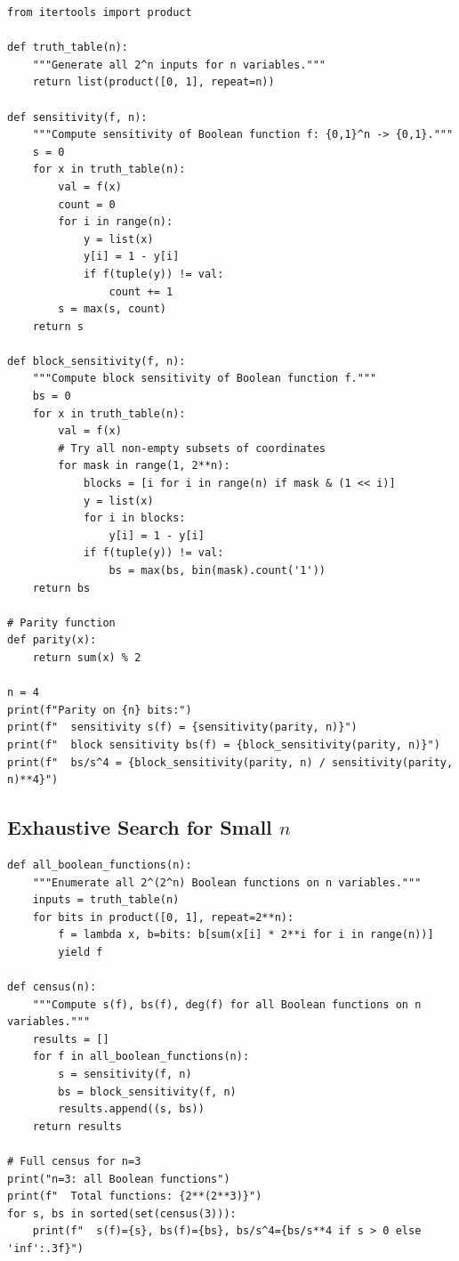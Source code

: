 \begin{verbatim}
from itertools import product

def truth_table(n):
    """Generate all 2^n inputs for n variables."""
    return list(product([0, 1], repeat=n))

def sensitivity(f, n):
    """Compute sensitivity of Boolean function f: {0,1}^n -> {0,1}."""
    s = 0
    for x in truth_table(n):
        val = f(x)
        count = 0
        for i in range(n):
            y = list(x)
            y[i] = 1 - y[i]
            if f(tuple(y)) != val:
                count += 1
        s = max(s, count)
    return s

def block_sensitivity(f, n):
    """Compute block sensitivity of Boolean function f."""
    bs = 0
    for x in truth_table(n):
        val = f(x)
        # Try all non-empty subsets of coordinates
        for mask in range(1, 2**n):
            blocks = [i for i in range(n) if mask & (1 << i)]
            y = list(x)
            for i in blocks:
                y[i] = 1 - y[i]
            if f(tuple(y)) != val:
                bs = max(bs, bin(mask).count('1'))
    return bs

# Parity function
def parity(x):
    return sum(x) % 2

n = 4
print(f"Parity on {n} bits:")
print(f"  sensitivity s(f) = {sensitivity(parity, n)}")
print(f"  block sensitivity bs(f) = {block_sensitivity(parity, n)}")
print(f"  bs/s^4 = {block_sensitivity(parity, n) / sensitivity(parity, n)**4}")
\end{verbatim}

\subsection{Exhaustive Search for Small $n$}

\begin{verbatim}
def all_boolean_functions(n):
    """Enumerate all 2^(2^n) Boolean functions on n variables."""
    inputs = truth_table(n)
    for bits in product([0, 1], repeat=2**n):
        f = lambda x, b=bits: b[sum(x[i] * 2**i for i in range(n))]
        yield f

def census(n):
    """Compute s(f), bs(f), deg(f) for all Boolean functions on n variables."""
    results = []
    for f in all_boolean_functions(n):
        s = sensitivity(f, n)
        bs = block_sensitivity(f, n)
        results.append((s, bs))
    return results

# Full census for n=3
print("n=3: all Boolean functions")
print(f"  Total functions: {2**(2**3)}")
for s, bs in sorted(set(census(3))):
    print(f"  s(f)={s}, bs(f)={bs}, bs/s^4={bs/s**4 if s > 0 else 'inf':.3f}")
\end{verbatim}

